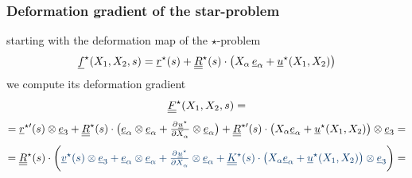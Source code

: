 \begin{frame}
  \frametitle{Deformation gradient of the star-problem}

  starting with the deformation map of the $\star$-problem
  \begin{displaymath}
    \underline{f}^{\star}(X_1,X_2,s) =
    \underline{r}^{\star}(s) + 
    \underline{\underline{R}}^{\star}(s) \cdot \bigl( X_{\alpha} \, \underline{e}_{\alpha} + \underline{u}^{\star}(X_1,X_2) \bigr)
  \end{displaymath}
  we compute its deformation gradient
  \vspace{0.3em}
  \begin{displaymath}
    \underline{\underline{F}}^{\star}(X_1,X_2,s) =
  \end{displaymath}
  \begin{displaymath}
    = \underline{r}^{\star \prime}(s) \otimes \underline{e}_3 +
      \doubleunderline{R}^{\star}(s) \cdot \bigl( \underline{e}_{\alpha} \otimes \underline{e}_{\alpha} +
      \pd{\underline{u}^{\star}}{X_{\alpha}} \otimes \underline{e}_{\alpha} \bigr) +
      \doubleunderline{R}^{\star \prime}(s) \cdot \bigl( X_{\alpha} \underline{e}_{\alpha} + \underline{u}^{\star}(X_1,X_2) \bigr) \otimes \underline{e}_3 =
  \end{displaymath}
  \begin{displaymath}
    = \doubleunderline{R}^{\star}(s) \cdot \biggl( {\color{faublue}
        \underline{v}^{\star}(s) \otimes \underline{e}_3 +
        \underline{e}_{\alpha} \otimes \underline{e}_{\alpha} + 
        \pd{\underline{u}^{\star}}{X_{\alpha}} \otimes \underline{e}_{\alpha} +
        \doubleunderline{K}^{\star}(s) \cdot \bigl( X_{\alpha} \underline{e}_{\alpha} + \underline{u}^{\star}(X_1,X_2) \bigr) \otimes \underline{e}_3 }
      \biggr) =
  \end{displaymath}
  \begin{displaymath}

\end{displaymath}
\end{frame}
